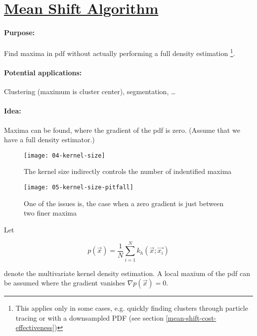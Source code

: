 
\section*{\href{http://ieeexplore.ieee.org/document/1000236/?arnumber=1000236&tag=1}{Mean Shift Algorithm}}

\paragraph{Purpose:}
Find maxima in pdf without actually performing a full density estimation \footnote{This applies only in some cases, e.g. quickly finding clusters through particle tracing or with a downsampled PDF (see section \ref{mean-shift-cost-effectiveness})}.

\paragraph{Potential applications:}
Clustering (maximum is cluster center), segmentation, \ldots{}

\paragraph{Idea:} Maxima can be found, where the gradient of the pdf is zero. (Assume that we have a full density estimator.)

\begin{figure}[H]
  \centering
  \begin{minipage}[b]{0.4\textwidth}
    \texttt{[image: 04-kernel-size]}
    \caption{The kernel size indirectly controls the number of indentified maxima}
  \end{minipage}
  \begin{minipage}[b]{0.4\textwidth}
    \texttt{[image: 05-kernel-size-pitfall]}
    \caption{One of the issues is, the case when a zero gradient is just between two finer maxima}
    \label{mean-shift-issue}
  \end{minipage}
\end{figure}

Let

\begin{equation*}
  p(\vec{x}) = \dfrac{1}{N} \sum_{i=1}^N k_h(\vec{x}; \vec{x_i})
\end{equation*}

denote the multivariate kernel density estimation. A local maxium of the pdf can be assumed where the gradient vanishes $\nabla p(\vec{x}) = 0$.

